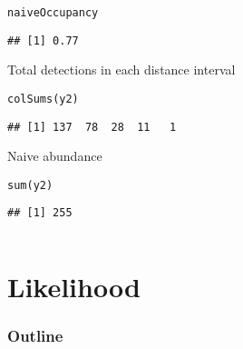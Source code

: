 \documentclass[color=usenames,dvipsnames]{beamer}\usepackage[]{graphicx}\usepackage[]{color}
\makeatletter
\newcommand{\hlstd}[1]{\textcolor[rgb]{0,0,0}{#1}}%
\newcommand{\hlkwd}[1]{\textcolor[rgb]{0.004,0.004,0.506}{#1}}%
\newenvironment{kframe}{%
 \def\at@end@of@kframe{}%
 \ifinner\ifhmode%
  \def\at@end@of@kframe{\end{minipage}}%
  \begin{minipage}{\columnwidth}%
 \fi\fi%
 \def\FrameCommand##1{\hskip\@totalleftmargin \hskip-\fboxsep
 \colorbox{shadecolor}{##1}\hskip-\fboxsep
     \hskip-\linewidth \hskip-\@totalleftmargin \hskip\columnwidth}%
 \MakeFramed {\advance\hsize-\width
   \@totalleftmargin\z@ \linewidth\hsize
   \@setminipage}}%
 {\par\unskip\endMakeFramed%
 \at@end@of@kframe}
\newenvironment{knitrout}{}{} %
\makeatother
\begin{document}
\begin{frame}[fragile]
\begin{columns}
\begin{column}{0.6\textwidth}
\begin{knitrout}
\begin{kframe}
\begin{alltt}
\hlstd{naiveOccupancy}
\end{alltt}
\begin{verbatim}
## [1] 0.77
\end{verbatim}
\end{kframe}
\end{knitrout}
  \pause
  \vfill
  \small
  Total detections in each distance interval
  \vspace{-6pt}
\begin{knitrout}\scriptsize
{}\color{fgcolor}\begin{kframe}
\begin{alltt}
\hlkwd{colSums}\hlstd{(y2)}
\end{alltt}
\begin{verbatim}
## [1] 137  78  28  11   1
\end{verbatim}
\end{kframe}
\end{knitrout}
  \pause
  \vfill
  Naive abundance
  \vspace{-6pt}
\begin{knitrout}\scriptsize
{}\color{fgcolor}\begin{kframe}
\begin{alltt}
\hlkwd{sum}\hlstd{(y2)}
\end{alltt}
\begin{verbatim}
## [1] 255
\end{verbatim}
\end{kframe}
\end{knitrout}

  \end{column}
  \end{columns}
\end{frame}









\section{Likelihood}


\begin{frame}
  \frametitle{Outline}
  \Large
  \tableofcontents[currentsection]
\end{frame}
\end{document}
